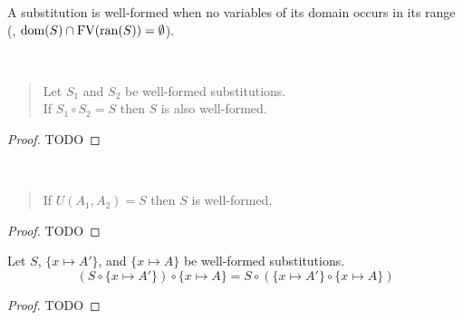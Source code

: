 A substitution is well-formed when no variables of its domain
occurs in its range (\ie, $\mathop{\mathrm{dom}}(S)\cap\mathop{\mathrm{FV}}(\mathop{\mathrm{ran}}(S))=\emptyset$).

\begin{proposition} ~
\begin{quote}
	Let $S_1$ and $S_2$ be well-formed substitutions.\\
	If $S_1\circ S_2=S$ then $S$ is also well-formed.
\end{quote}
\end{proposition}
\begin{proof}
	TODO
\end{proof}

\begin{proposition} ~
\begin{quote}
	If $U(A_1,A_2)=S$ then $S$ is well-formed.
\end{quote}
\end{proposition}
\begin{proof}
	TODO
\end{proof}

\begin{lemma}
Let $S$, $\{x\mapsto A'\}$, and $\{x\mapsto A\}$ be well-formed substitutions.
	\[ (S \circ \{x\mapsto A'\}) \circ \{x\mapsto A\} =
	S \circ (\{x\mapsto A'\} \circ \{x\mapsto A\}) \]
\end{lemma}
\begin{proof}
TODO
\end{proof}

